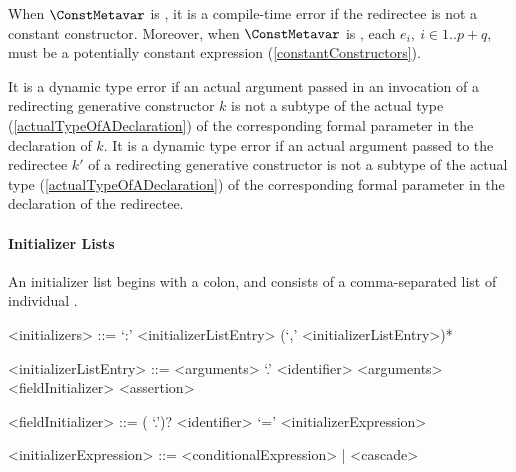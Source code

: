 \documentclass[makeidx]{article}
\begin{document}
\LMHash{}%
When $\ConstMetavar$ is \CONST{},
it is a compile-time error if the redirectee is not a constant constructor.
Moreover, when $\ConstMetavar$ is \CONST{}, each
$e_i,\ i \in 1 .. p+q$,
must be a potentially constant expression (\ref{constantConstructors}).

\LMHash{}%
It is a dynamic type error if an actual argument passed
in an invocation of a redirecting generative constructor $k$
is not a subtype of the actual type (\ref{actualTypeOfADeclaration})
of the corresponding formal parameter in the declaration of $k$.
It is a dynamic type error if an actual argument passed
to the redirectee $k'$ of a redirecting generative constructor
is not a subtype of the actual type
(\ref{actualTypeOfADeclaration})
of the corresponding formal parameter in the declaration of the redirectee.


\paragraph{Initializer Lists}

\LMHash{}%
An initializer list begins with a colon, and consists of a comma-separated list of individual .


\begin{grammar}
<initializers> ::= `:' <initializerListEntry> (`,' <initializerListEntry>)*

<initializerListEntry> ::= \SUPER{} <arguments>
  \alt \SUPER{} `.' <identifier> <arguments>
  \alt <fieldInitializer>
  \alt <assertion>

<fieldInitializer> ::= \gnewline{}
  (\THIS{} `.')? <identifier> `=' <initializerExpression>

<initializerExpression> ::= <conditionalExpression> | <cascade>
\end{grammar}
\end{document}
